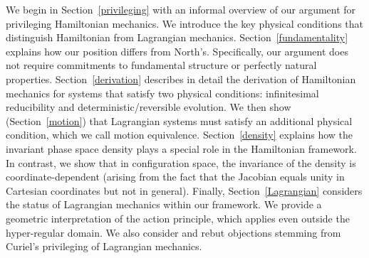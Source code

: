 \documentclass[letterpaper]{article}
\begin{document}



We begin in Section~\ref{privileging} with an informal overview of our argument for privileging Hamiltonian mechanics. We introduce the key physical conditions that distinguish Hamiltonian from Lagrangian mechanics. Section~\ref{fundamentality} explains how our position differs from North's. Specifically, our argument does not require commitments to fundamental structure or perfectly natural properties. Section~\ref{derivation} describes in detail the derivation of Hamiltonian mechanics for systems that satisfy two physical conditions: infinitesimal reducibility and deterministic/reversible evolution. We then show (Section~\ref{motion}) that Lagrangian systems must satisfy an additional physical condition, which we call motion equivalence. Section~\ref{density} explains how the invariant phase space density plays a special role in the Hamiltonian framework. In contrast, we show that in configuration space, the invariance of the density is coordinate-dependent (arising from the fact that the Jacobian equals unity in Cartesian coordinates but not in general). Finally, Section~\ref{Lagrangian} considers the status of Lagrangian mechanics within our framework. We provide a geometric interpretation of the action principle, which applies even outside the hyper-regular domain. We also consider and rebut objections stemming from Curiel's \parencites*[]{Curiel} privileging of Lagrangian mechanics.


\end{document}
